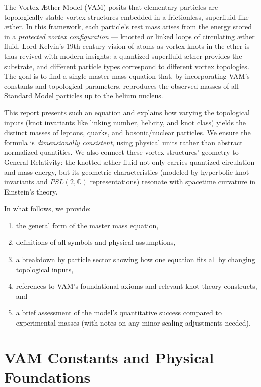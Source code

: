     The Vortex Æther Model (VAM) posits that elementary particles are topologically stable vortex structures embedded in a frictionless, superfluid-like æther. In this framework, each particle’s rest mass arises from the energy stored in a \textit{protected vortex configuration} — knotted or linked loops of circulating æther fluid. Lord Kelvin’s 19th-century vision of atoms as vortex knots in the ether is thus revived with modern insights: a quantized superfluid æther provides the substrate, and different particle types correspond to different vortex topologies. The goal is to find a single master mass equation that, by incorporating VAM’s constants and topological parameters, reproduces the observed masses of all Standard Model particles up to the helium nucleus.

    This report presents such an equation and explains how varying the topological inputs (knot invariants like linking number, helicity, and knot class) yields the distinct masses of leptons, quarks, and bosonic/nuclear particles. We ensure the formula is \textit{dimensionally consistent}, using physical units rather than abstract normalized quantities. We also connect these vortex structures’ geometry to General Relativity: the knotted æther fluid not only carries quantized circulation and mass-energy, but its geometric characteristics (modeled by hyperbolic knot invariants and $PSL(2,\mathbb{C})$ representations) resonate with spacetime curvature in Einstein’s theory.

    In what follows, we provide:
    \begin{enumerate}
        \item the general form of the master mass equation,
        \item definitions of all symbols and physical assumptions,
        \item a breakdown by particle sector showing how one equation fits all by changing topological inputs,
        \item references to VAM’s foundational axioms and relevant knot theory constructs, and
        \item a brief assessment of the model’s quantitative success compared to experimental masses (with notes on any minor scaling adjustments needed).
    \end{enumerate}

    \bigskip

    \section{VAM Constants and Physical Foundations}

